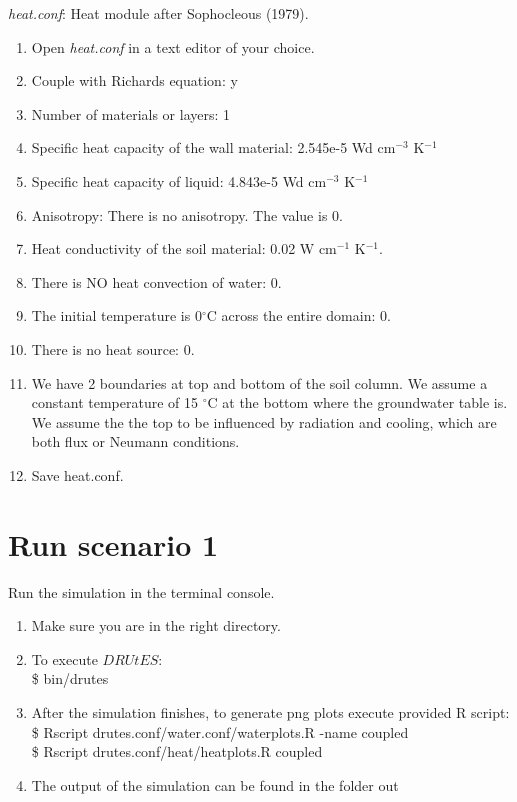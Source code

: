 \documentclass[
10pt, %
a4paper, %
oneside, %
headinclude,footinclude, %
BCOR5mm, %
]{scrartcl}
\begin{document}
\emph{heat.conf}: Heat module after Sophocleous (1979). 


\begin{enumerate}
\item Open \emph{heat.conf} in a text editor of your choice. 

\item Couple with Richards equation: y
\item Number of materials or layers: 1 
\item Specific heat capacity of the wall material:  2.545e-5 Wd cm$^{-3}$ K$^{-1}$ 
\item Specific heat capacity of liquid: 4.843e-5  Wd cm$^{-3}$ K$^{-1}$ 
\item Anisotropy: There is no anisotropy. The value is 0.
\item Heat conductivity of the soil material: 0.02 W cm$^{-1}$ K$^{-1}$. 
\item There is NO heat convection of water: 0.
\item The initial temperature is 0$^{\circ}$C across the entire domain: 0.
\item There is no heat source: 0. 
\item We have 2 boundaries at top and bottom of the soil column. We assume a constant temperature of 15 $^{\circ}$C at the bottom where the groundwater table is. We assume the the top to be influenced by radiation and cooling, which are both flux or Neumann conditions. \\

\item Save heat.conf.
\end{enumerate}

\section*{Run scenario 1}
Run the simulation in the terminal console.
\begin{enumerate}
\item Make sure you are in the right directory. 
\item To execute $DRUtES$: \\
\$ bin/drutes
\item After the simulation finishes, to generate png plots execute provided R script: \\
\$ Rscript drutes.conf/water.conf/waterplots.R -name coupled \\
\$ Rscript drutes.conf/heat/heatplots.R coupled
\item The output of the simulation can be found in the folder out
\end{enumerate}
\end{document}
